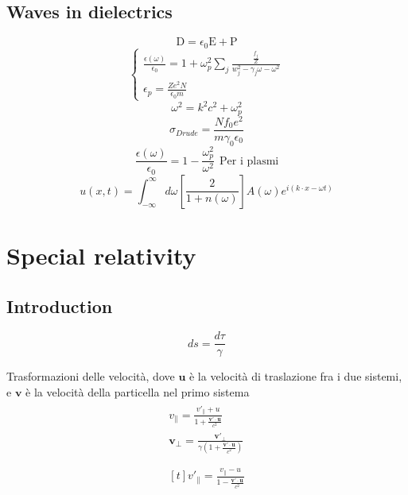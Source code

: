 \documentclass[a4paper, twocolumn]{article}
\begin{document}
\subsection{Waves in dielectrics}
\begin{equation}
	\mathrm{D}=\epsilon_0 \mathrm{E} + \mathrm{P}
\end{equation}
\begin{equation}
\begin{cases}
\frac{\epsilon(\omega)}{\epsilon_0} =1 + \omega_p ^2 \sum_j \frac{\frac{f_j}{Z}}{w_j^2 - \gamma_j \omega - \omega^2} \\
\epsilon_p=\frac{Z e^2 N}{\epsilon_0 m}
\end{cases}
\end{equation}
\begin{equation}
	\omega^2=k^2c^2+\omega_p^2
\end{equation}
\begin{equation}
	\sigma_{Drude}=\frac{N f_0 e^2}{m \gamma_0 \epsilon_0}
\end{equation}
\begin{equation}
	\frac{\epsilon(\omega)}{\epsilon_0} = 1 -\frac{\omega_p^2}{\omega^2} ~~\text{Per i plasmi}
\end{equation}
\begin{equation}
	u(x,t)=\int_{-\infty}^{\infty}d\omega \left[\frac{2}{1+n(\omega)}\right]A(\omega) e^{i(k \cdot x-\omega t)} \tag{onda piana incidente in mezzo con $n(\omega)$}
\end{equation}

\section{Special relativity}

\subsection{Introduction}
\begin{equation}
  ds= \frac{d\tau}{\gamma}
\end{equation}

Trasformazioni delle velocità, dove $\mathbf{u}$ è la velocità di traslazione fra i due sistemi, e $\mathbf{v}$ è la velocità della particella nel primo sistema
\begin{gather}
  \begin{split}
    v_{\parallel}=\frac{v'_{\parallel}+u}{1+\frac{\mathbf{v'} \cdot \mathbf{u}}{c^2}} \\
    \mathbf{v}_{\bot}=\frac{\mathbf{v}'_{\bot}}{\gamma (1+\frac{\mathbf{v'} \cdot \mathbf{u}}{c^2})} \\
  \end{split}\\
  \begin{aligned}[t]
    v'_{\parallel}=\frac{v_{\parallel}-u}{1-\frac{\mathbf{v'} \cdot \mathbf{u}}{c^2}}     
  \end{aligned}
\end{gather}
\end{document}
